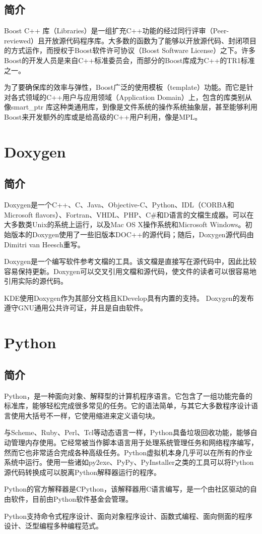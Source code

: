 	\subsection{简介}
	\par Boost C++ 库（Libraries）是一组扩充C++功能的经过同行评审（Peer-reviewed）且开放源代码程序库。大多数的函数为了能够以开放源代码、封闭项目的方式运作，而授权于Boost软件许可协议（Boost Software License）之下。许多Boost的开发人员是来自C++标准委员会，而部分的Boost库成为C++的TR1标准之一。
	\par 为了要确保库的效率与弹性，Boost广泛的使用模板（template）功能。而它是针对各式领域的C++用户与应用领域（Application Domain）上，包含的库类别从像smart\_ptr 库这种类通用库，到像是文件系统的操作系统抽象层，甚至能够利用Boost来开发额外的库或是给高级的C++用户利用，像是MPL。\cite{ wiki:Boost}
\section{Doxygen}
	\subsection{简介}
	\par Doxygen是一个C++、C、Java、Objective-C、Python、IDL（CORBA和Microsoft flavors）、Fortran、VHDL、PHP、C\#和D语言的文檔生成器。可以在大多数类Unix的系统上运行，以及Mac OS X操作系统和Microsoft Windows。初始版本的Doxygen使用了一些旧版本DOC++的源代码；随后，Doxygen源代码由Dimitri van Heesch重写。
	\par Doxygen是一个编写软件参考文檔的工具。该文檔是直接写在源代码中，因此比较容易保持更新。Doxygen可以交叉引用文檔和源代码，使文件的读者可以很容易地引用实际的源代码。
	\par KDE使用Doxygen作为其部分文档且KDevelop具有内置的支持。 Doxygen的发布遵守GNU通用公共许可证，并且是自由软件。\cite{ wiki:Doxygen}
\section{Python}
	\subsection{简介}
	\par Python，是一种面向对象、解释型的计算机程序语言。它包含了一组功能完备的标准库，能够轻松完成很多常见的任务。它的语法简单，与其它大多数程序设计语言使用大括号不一样，它使用缩进来定义语句块。
	\par 与Scheme、Ruby、Perl、Tcl等动态语言一样，Python具备垃圾回收功能，能够自动管理内存使用。它经常被当作脚本语言用于处理系统管理任务和网络程序编写，然而它也非常适合完成各种高级任务。Python虚拟机本身几乎可以在所有的作业系统中运行。使用一些诸如py2exe、PyPy、PyInstaller之类的工具可以将Python源代码转换成可以脱离Python解释器运行的程序。
	\par Python的官方解释器是CPython，该解释器用C语言编写，是一个由社区驱动的自由软件，目前由Python软件基金会管理。
	\par Python支持命令式程序设计、面向对象程序设计、函数式编程、面向侧面的程序设计、泛型编程多种编程范式。\cite{ wiki:Python}
